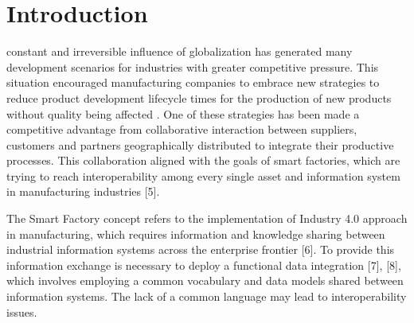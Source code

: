 \documentclass[peerreview]{IEEEtran}
\begin{document}
\section{Introduction}
% 
% 
% 
% 
 constant and irreversible influence of globalization has generated many development scenarios for industries with greater competitive pressure. This situation encouraged manufacturing companies to embrace new strategies to reduce product development lifecycle times for the production of new products without quality being affected \cite{}. One of these strategies has been made a competitive advantage from collaborative interaction between suppliers, customers and partners geographically distributed to integrate their productive processes. This collaboration aligned with the goals of smart factories, which are trying to reach interoperability among every single asset and information system in manufacturing industries \cite{}[5].


The Smart Factory concept refers to the implementation of Industry 4.0 approach in manufacturing, which requires information and knowledge sharing between industrial information systems across the enterprise frontier \cite{}[6]. To provide this information exchange is necessary to deploy a functional data integration  \cite{}[7], [8], which involves employing a common vocabulary and data models shared between information systems. The lack of a common language may lead to interoperability issues. 
\end{document}
